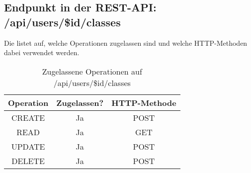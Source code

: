 \subsection{Endpunkt in der REST-API: /api/users/\$id/classes}
Die  listet auf, welche Operationen zugelassen sind und welche HTTP-Methoden dabei verwendet werden. 

\begin{table}[!htbp]
	\begin{tabular}{|c|c|c|}
		\hline
			\textbf{Operation} & \textbf{Zugelassen?} & \textbf{HTTP-Methode} \\ \hline
			CREATE & Ja & POST \\ \hline 
			READ & Ja & GET \\ \hline
			UPDATE & Ja & POST \\ \hline 
			DELETE & Ja & POST \\ \hline
	\end{tabular}

		\caption{Zugelassene Operationen auf /api/users/\$id/classes}
		\label{tab:rest:api:users:id:classes:meth}
\end{table}

